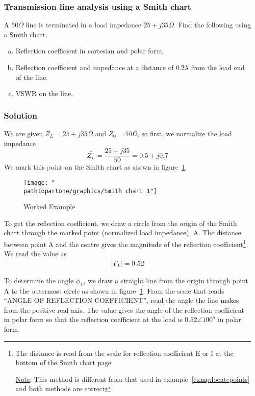 \begin{exmp}
\subsubsection*{Transmission line analysis using a Smith chart}
A 50$\Omega$ line is terminated in a load impedance $25+j35\Omega$. Find the following using a Smith chart.
\begin{enumerate}[(a)]
\item Reflection coefficient in cartesian and polar form,
\item Reflection coefficient and impedance at a distance of $0.2\lambda$ from the load end of the line.
\item VSWR on the line.
\end{enumerate}

\subsubsection*{Solution}
We are given $Z_{L}=25+j35\varOmega$ and $Z_{0}=50\varOmega$, so first, we normalize the load impedance
\begin{dmath*}
\bar{Z_{L}}=\frac{25+j35}{50}=0.5+j0.7
\end{dmath*}
We mark this point on the Smith chart as shown in figure~\ref{fig:workedexample2}.
\begin{figure}[h]
\centering
\texttt{[image: "\\pathtopartone/graphics/Smith chart 1"]}
\caption{Worked Example}
\label{fig:workedexample2}
\end{figure}

To get the reflection coefficient, we draw a circle from the origin of the Smith chart through the marked point (normalized load impedance), A. The distance between point A and the centre gives the magnitude of the reflection coefficient\footnote{
The distance is read from the scale for reflection coefficient E or I at the bottom of the Smith chart page

\underline{Note}: This method is different from that used in example~\ref{exmp:locatepoints} and both methods are correct
}. We read the value as
\begin{align*}
|\Gamma_{L}| = 0.52
\end{align*}

To determine the angle $\phi_{L}$, we draw a straight line from the origin through point A to the outermost circle as shown in figure~\ref{fig:workedexample2}. From the scale that reads \textquotedblleft ANGLE OF REFLECTION COEFFICIENT\textquotedblright\;, read the angle the line makes from the positive real axis. The value gives the angle of the reflection coefficient in polar form so that the reflection coefficient at the load is $0.52\angle100^o$ in polar form.


\end{exmp}
